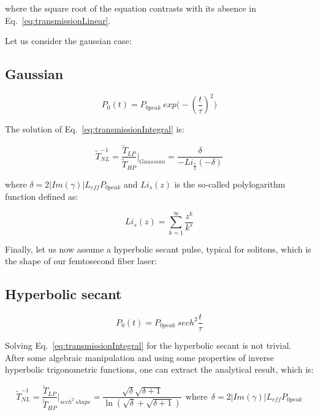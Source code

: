 \documentclass[10pt,letterpaper]{article}
\begin{document}
where the square root of the equation contrasts with its absence in Eq.~\ref{eq:transmissionLinear}.

Let us consider the gaussian case:

\subsection{Gaussian}

\begin{equation}
 P_0(t) = P_{0 peak}~exp \big( - (\frac{t}{\tau})^2 \big)
\end{equation}


The solution of Eq.~\ref{eq:transmissionIntegral} is:


\begin{equation}
  \tilde{T}^{-1}_{NL}  = \frac{\tilde{T}_{LP}}{\tilde{T}_{HP}} \bigg|_{Gaussian}  = \frac{\delta}{-Li_{\frac{1}{2}}(-\delta)}
\label{eq:transmissionGaussian}
\end{equation}

where $ \delta = 2|Im(\gamma)| L_{eff} P_{0 peak} $ and $Li_s(z)$ is the so-called polylogarithm function defined as:


\begin{equation}
 Li_s(z) = \sum\limits_{k=1}^\infty \frac{z^k}{k^s}
\end{equation}



Finally, let us now assume a hyperbolic secant pulse, typical for solitons, which is the shape of our femtosecond fiber laser:
\subsection{Hyperbolic secant}
\begin{equation}
 P_0(t) = P_{0 peak}~sech^2 \frac{t}{\tau}
\end{equation}



Solving Eq.~\ref{eq:transmissionIntegral} for the hyperbolic secant is not trivial. After some algebraic manipulation and using some properties of inverse hyperbolic trigonometric functions, one can extract the analytical result, which is:


\begin{equation}
 \tilde{T}^{-1}_{NL}  = \frac{\tilde{T}_{LP}}{\tilde{T}_{HP}} \bigg|_{sech^2~shape}  = \frac{\sqrt{\delta}\sqrt{\delta + 1}}{\ln(\sqrt{\delta}+\sqrt{\delta+1})} ~~\mathrm{where}~~  \delta = 2|Im(\gamma)| L_{eff} P_{0 peak}
\label{eq:transmissionHypSecant}
\end{equation}
\end{document}
